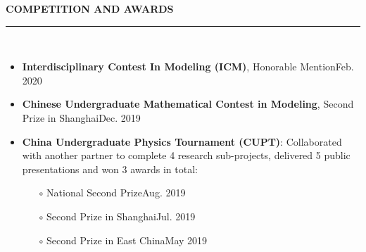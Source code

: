 \documentclass[letterpaper,11pt]{article}
\begin{document}
{\Large\bfseries{}COMPETITION AND AWARDS}\\
\rule[1.5ex]{\columnwidth}{1pt}\\
\vspace{-5ex}
\begin{itemize}
    \item {\bfseries{}Interdisciplinary Contest In Modeling (ICM)}, {Honorable Mention}\hfill{Feb. 2020}
    \item {\bfseries{}Chinese Undergraduate Mathematical Contest in Modeling}, {Second Prize in Shanghai}\hfill{Dec. 2019}
    \item {\bfseries{}China Undergraduate Physics Tournament (CUPT)}: Collaborated with another partner to complete 4 research sub-projects, delivered 5 public presentations and won 3 awards in total:
    \begin{itemize}
        \item[$\circ$] {National Second Prize}\hfill{Aug. 2019}
        \item[$\circ$] {Second Prize in Shanghai}\hfill{Jul. 2019}
        \item[$\circ$] {Second Prize in East China}\hfill{May 2019}
    \end{itemize}
\end{itemize}
\end{document}
